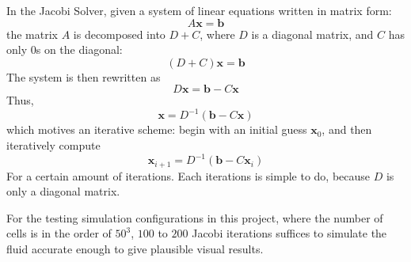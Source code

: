 In the Jacobi Solver, given a system of linear equations written in matrix form:
$$
A\textbf{x}=\textbf{b}
$$
the matrix $A$ is decomposed into $D+C$, where $D$ is a diagonal matrix, and $C$ has only $0$s on the diagonal:
$$
(D+C)\textbf{x}=\textbf{b}
$$
The system is then rewritten as 
$$
D\textbf{x}=\textbf{b} - C\textbf{x}
$$
Thus,
$$
\textbf{x}=D^{-1}(\textbf{b} - C\textbf{x})
$$
which motives an iterative scheme: begin with an initial guess $\textbf{x}_0$, and then iteratively compute
$$
\textbf{x}_{i+1} = D^{-1}(\textbf{b} - C\textbf{x}_{i})
$$
For a certain amount of iterations. Each iterations is simple to do, because $D$ is only a diagonal matrix. 

For the testing simulation configurations in this project, where the number of cells is in the order of $50^3$, $100$ to $200$ Jacobi iterations suffices to simulate the fluid accurate enough to give plausible visual results. 
